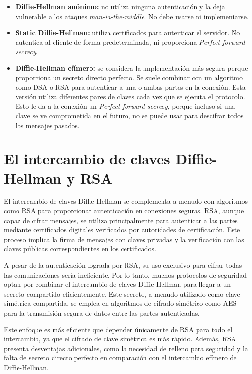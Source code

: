\documentclass[11pt]{article}
\begin{document}
\begin{itemize}
    \item \textbf{Diffie-Hellman anónimo:} no utiliza ninguna autenticación y la deja vulnerable a los ataques \emph{man-in-the-middle}. No debe usarse ni implementarse.
    \item \textbf{Static Diffie-Hellman:} utiliza certificados para autenticar el servidor. No autentica al cliente de forma predeterminada, ni proporciona \emph{Perfect forward secrecy}.
    \item \textbf{Diffie-Hellman efímero:} se considera la implementación más segura porque proporciona un secreto directo perfecto. Se  suele combinar con un algoritmo como DSA o RSA para autenticar a una o ambas partes en la conexión. Esta versión utiliza diferentes pares de claves cada vez que se ejecuta el protocolo. Esto le da a la conexión un \emph{Perfect forward secrecy}, porque incluso si una clave se ve comprometida en el futuro, no se puede usar para descifrar todos los mensajes pasados.\\
\end{itemize}


\section{El intercambio de claves Diffie-Hellman y RSA}

El intercambio de claves Diffie-Hellman se complementa a menudo con algoritmos como RSA para proporcionar autenticación en conexiones seguras. RSA, aunque capaz de cifrar mensajes, se utiliza principalmente para autenticar a las partes mediante certificados digitales verificados por autoridades de certificación. Este proceso implica la firma de mensajes con claves privadas y la verificación con las claves públicas correspondientes en los certificados.

A pesar de la autenticación lograda por RSA, su uso exclusivo para cifrar todas las comunicaciones sería ineficiente. Por lo tanto, muchos protocolos de seguridad optan por combinar el intercambio de claves Diffie-Hellman para llegar a un secreto compartido eficientemente. Este secreto, a menudo utilizado como clave simétrica compartida, se emplea en algoritmos de cifrado simétrico como AES para la transmisión segura de datos entre las partes autenticadas.

Este enfoque es más eficiente que depender únicamente de RSA para todo el intercambio, ya que el cifrado de clave simétrica es más rápido. Además, RSA presenta desventajas adicionales, como la necesidad de relleno para seguridad y la falta de secreto directo perfecto en comparación con el intercambio efímero de Diffie-Hellman.
\end{document}
